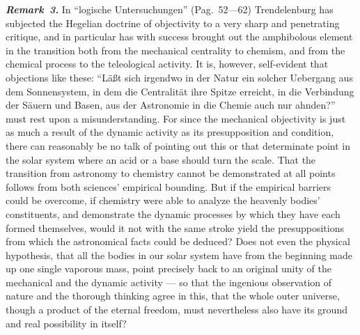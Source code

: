 \documentclass[12pt]{book}
\newcommand{\anm}[1]{\emph{\textbf{Remark~#1.}}}
\begin{document}
\anm{3} In ``logische Untersuchungen'' (Pag.\ 52---62) Trendelenburg has
subjected the Hegelian doctrine of objectivity to a very sharp and
penetrating critique, and in particular has with success brought out the
amphibolous element in the transition both from the mechanical centrality to
chemism, and from the chemical process to the teleological activity. It is,
however, self-evident that objections like these: ``Läßt sich irgendwo in
der Natur ein solcher Uebergang aus dem Sonnensystem, in dem die Centralität
ihre Spitze erreicht, in die Verbindung der Säuern und Basen, aus der
Astronomie in die Chemie auch nur ahnden?'' must rest upon a
misunderstanding. For since the mechanical objectivity is just as much a
result of the dynamic activity as its presupposition and condition, there
can reasonably be no talk of pointing out this or that determinate point in
the solar system where an acid or a base should turn the scale. That the
transition from astronomy to chemistry cannot be demonstrated at all points
follows from both sciences' empirical bounding. But if the empirical
barriers could be overcome, if chemistry were able to analyze the heavenly
bodies' constituents, and demonstrate the dynamic processes by which they
have each formed themselves, would it not with the same stroke yield the
presuppositions from which the astronomical facts could be deduced? Does not
even the physical hypothesis, that all the bodies in our solar system have
from the beginning made up one single vaporous mass, point precisely back to
an original unity of the mechanical and the dynamic activity --- so that the
ingenious observation of nature and the thorough thinking agree in this,
that the whole outer universe, though a product of the eternal freedom, must
nevertheless also have its ground and real possibility in itself?
\end{document}
